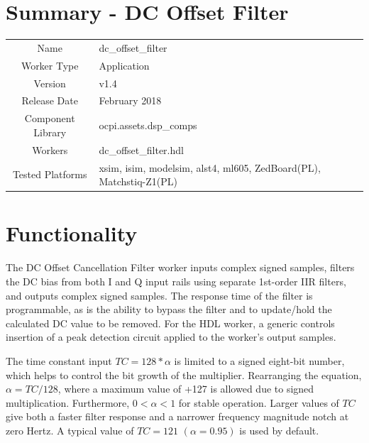 \documentclass{article}
\author{} %
\date{Version \docVersion} %
\title{\docTitle}
\def\docVersion{1.4}
\def\comp{dc\_offset\_filter}
\def\Comp{DC Offset Filter}
\begin{document}
\section*{Summary - \Comp}
\begin{tabular}{|c|M{13.5cm}|}
	\hline
	                  &                                                    \\
	\hline
	Name              & \comp                                              \\
	\hline
	Worker Type       & Application                                        \\
	\hline
	Version           & v\docVersion \\
	\hline
	Release Date      & February 2018 \\
	\hline
	Component Library & ocpi.assets.dsp\_comps                              \\
	\hline
	Workers           & \comp.hdl                                          \\
	\hline
	Tested Platforms  & xsim, isim, modelsim, alst4, ml605, ZedBoard(PL), Matchstiq-Z1(PL) \\
	\hline
\end{tabular}

\section*{Functionality}
\begin{flushleft}
	The DC Offset Cancellation Filter worker inputs complex signed samples, filters the DC bias from both I and Q input rails using separate 1st-order IIR filters, and outputs complex signed samples. The response time of the filter is programmable, as is the ability to bypass the filter and to update/hold the calculated DC value to be removed. For the HDL worker, a generic controls insertion of a peak detection circuit applied to the worker's output samples.\medskip

	The time constant input $TC = 128*\alpha$ is limited to a signed eight-bit number, which helps to control the bit growth of the multiplier. Rearranging the equation, $\alpha = TC/128$, where a maximum value of +127 is allowed due to signed multiplication. Furthermore, $0<\alpha<1$ for stable operation. Larger values of $TC$ give both a faster filter response and a narrower frequency magnitude notch at zero Hertz. A typical value of $TC = 121$ $(\alpha = 0.95)$ is used by default.
\end{flushleft}
\end{document}
